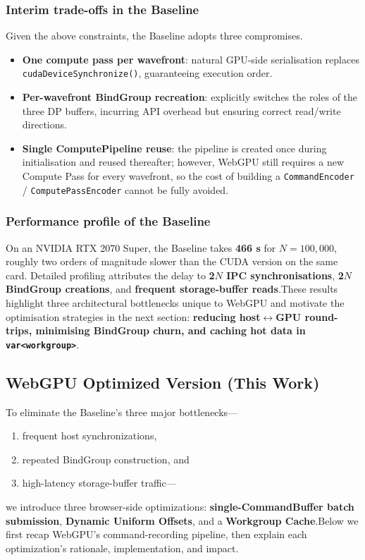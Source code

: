 \documentclass[PhD]{PHlab-thesis}
\begin{document}
\subsubsection{Interim trade-offs in the Baseline}
Given the above constraints, the Baseline adopts three compromises.
\begin{itemize}
    \item \textbf{One compute pass per wavefront}: natural GPU-side serialisation replaces \texttt{cudaDeviceSynchronize()}, guaranteeing execution order.
    \item \textbf{Per-wavefront BindGroup recreation}: explicitly switches the roles of the three DP buffers, incurring API overhead but ensuring correct read/write directions.
    \item \textbf{Single ComputePipeline reuse}: the pipeline is created once during initialisation and reused thereafter; however, WebGPU still requires a new Compute Pass for every wavefront, so the cost of building a \texttt{CommandEncoder} / \texttt{ComputePassEncoder} cannot be fully avoided.
\end{itemize}

\subsubsection{Performance profile of the Baseline}
On an NVIDIA RTX 2070 Super, the Baseline takes \textbf{466 s} for $N=100,000$, roughly two orders of magnitude slower than the CUDA version on the same card.
Detailed profiling attributes the delay to \textbf{2$N$ IPC synchronisations}, \textbf{2$N$ BindGroup creations}, and \textbf{frequent storage-buffer reads}.These results highlight three architectural bottlenecks unique to WebGPU and motivate the optimisation strategies in the next section: \textbf{reducing host$\leftrightarrow$GPU round-trips, minimising BindGroup churn, and caching hot data in \texttt{var<workgroup>}}.

\subsection{WebGPU Optimized Version (This Work)}
To eliminate the Baseline’s three major bottlenecks—
\begin{enumerate}
    \item frequent host synchronizations,
    \item repeated BindGroup construction, and
    \item high-latency storage-buffer traffic—
\end{enumerate}
we introduce three browser-side optimizations: \textbf{single-CommandBuffer batch submission}, \textbf{Dynamic Uniform Offsets}, and a \textbf{Workgroup Cache}.Below we first recap WebGPU’s command-recording pipeline, then explain each optimization’s rationale, implementation, and impact.
\end{document}

